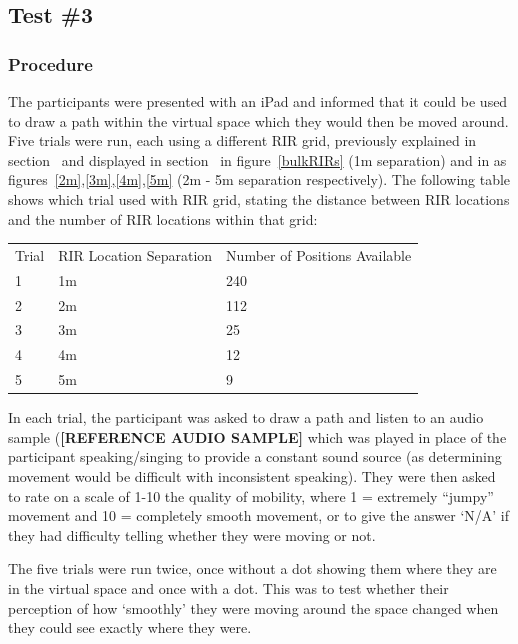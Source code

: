 \documentclass[../../main.tex]{subfiles}
\begin{document}
		\subsection{Test \#3}
			\label{usertests:test3}

			\subsubsection{Procedure}
				The participants were presented with an iPad and informed that it could be used to draw a path within the virtual space which they would then be moved around. Five trials were run, each using a different \ac{RIR} grid, previously explained in section~ and displayed in section~  in figure~\ref{bulkRIRs} (1m separation) and in  as figures~\ref{2m},\ref{3m},\ref{4m},\ref{5m} (2m - 5m separation respectively). The following table shows which trial used with \ac{RIR} grid, stating the distance between \ac{RIR} locations and the number of \ac{RIR} locations within that grid:

				\begin{center}
					\begin{tabu} to 0.9\textwidth{X[1,c] X[2,c] X[2,c]}
					Trial & \ac{RIR} Location Separation & Number of Positions Available \\
						1 & 1m & 240 \\
						2 & 2m & 112 \\
						3 & 3m & 25 \\
						4 & 4m & 12 \\
						5 & 5m & 9 \\
					\end{tabu}
				\end{center}
				\vspace{5mm}
				In each trial, the participant was asked to draw a path and listen to an audio sample \cite{trumpet} (\textbf{[REFERENCE AUDIO SAMPLE]} which was played in place of the participant speaking/singing to provide a constant sound source (as determining movement would be difficult with inconsistent speaking). They were then asked to rate on a scale of 1-10 the quality of mobility, where 1 = extremely ``jumpy'' movement and 10 = completely smooth movement, or to give the answer `N/A' if they had difficulty telling whether they were moving or not.

				The five trials were run twice, once without a dot showing them where they are in the virtual space and once with a dot. This was to test whether their perception of how `smoothly' they were moving around the space changed when they could see exactly where they were.
\end{document}
